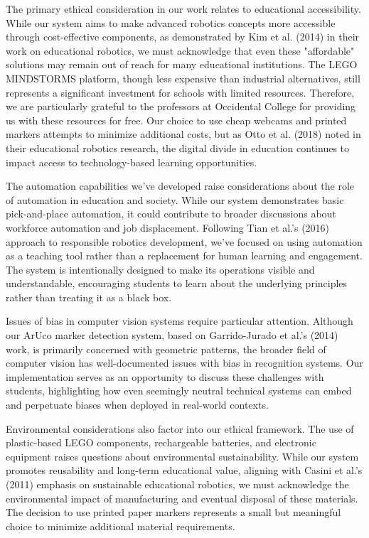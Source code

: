 \documentclass[10pt,twocolumn]{article}
\begin{document}
The primary ethical consideration in our work relates to educational accessibility. While our system aims to make advanced robotics concepts more accessible through cost-effective components, as demonstrated by Kim et al. (2014) \cite{kim2014using} in their work on educational robotics, we must acknowledge that even these "affordable" solutions may remain out of reach for many educational institutions. The LEGO MINDSTORMS platform, though less expensive than industrial alternatives, still represents a significant investment for schools with limited resources. Therefore, we are particularly grateful to the professors at Occidental College for providing us with these resources for free. Our choice to use cheap webcams and printed markers attempts to minimize additional costs, but as Otto et al. (2018) \cite{otto2018teaching} noted in their educational robotics research, the digital divide in education continues to impact access to technology-based learning opportunities.

The automation capabilities we've developed raise considerations about the role of automation in education and society. While our system demonstrates basic pick-and-place automation, it could contribute to broader discussions about workforce automation and job displacement. Following Tian et al.'s (2016) \cite{tian2016development} approach to responsible robotics development, we've focused on using automation as a teaching tool rather than a replacement for human learning and engagement. The system is intentionally designed to make its operations visible and understandable, encouraging students to learn about the underlying principles rather than treating it as a black box.

Issues of bias in computer vision systems require particular attention. Although our ArUco marker detection system, based on Garrido-Jurado et al.'s (2014) \cite{garrido2014automatic} work, is primarily concerned with geometric patterns, the broader field of computer vision has well-documented issues with bias in recognition systems. Our implementation serves as an opportunity to discuss these challenges with students, highlighting how even seemingly neutral technical systems can embed and perpetuate biases when deployed in real-world contexts.

Environmental considerations also factor into our ethical framework. The use of plastic-based LEGO components, rechargeable batteries, and electronic equipment raises questions about environmental sustainability. While our system promotes reusability and long-term educational value, aligning with Casini et al.'s (2011) \cite{casini2011lego} emphasis on sustainable educational robotics, we must acknowledge the environmental impact of manufacturing and eventual disposal of these materials. The decision to use printed paper markers represents a small but meaningful choice to minimize additional material requirements.
\end{document}
